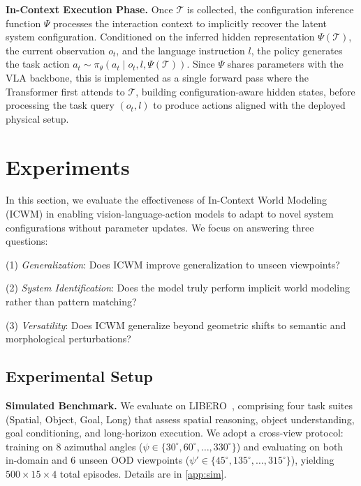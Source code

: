 \documentclass{llmxive}
\begin{document}
\textbf{In-Context Execution Phase.} Once $\mathcal{T}$ is collected, the 
configuration inference function $\Psi$ processes the interaction context to implicitly recover the 
latent system configuration. Conditioned on the inferred hidden representation $\Psi\left(\mathcal{T}\right)$, the current observation $o_t$, and the language instruction $l$, the policy generates the task action $a_t \sim \pi_\theta\left(a_t \mid o_t, l, \Psi\left(\mathcal{T}\right)\right)$.
Since $\Psi$ shares parameters with the VLA backbone, this is implemented as a single forward pass where the Transformer first attends to $\mathcal{T}$, building configuration-aware hidden states, before processing the task query $\left(o_t, l\right)$ to produce actions aligned with the deployed physical setup.





\section{Experiments}


In this section, we evaluate the effectiveness of In-Context World Modeling (ICWM) in enabling vision-language-action models to adapt to novel system configurations without parameter updates.
We focus on answering three questions: 

(1) \textit{Generalization}: Does ICWM improve generalization to unseen viewpoints? 

(2) \textit{System Identification}: Does the model truly perform implicit world modeling rather than pattern matching? 

(3) \textit{Versatility}: Does ICWM generalize beyond geometric shifts to semantic and morphological perturbations?


\subsection{Experimental Setup}

\textbf{Simulated Benchmark.} 
We evaluate on LIBERO~\cite{liu2023libero}, 
comprising four task suites (Spatial, Object, Goal, Long) that assess spatial 
reasoning, object understanding, goal conditioning, and long-horizon execution. 
We adopt a cross-view protocol: training on 8 azimuthal angles 
($\psi \in \{30^\circ, 60^\circ, \dots, 330^\circ\}$) and evaluating on both 
in-domain and 6 unseen OOD viewpoints 
($\psi' \in \{45^\circ, 135^\circ, \dots, 315^\circ\}$), yielding 
$500 \times 15 \times 4$ total episodes. Details are in \autoref{app:sim}.
\end{document}
